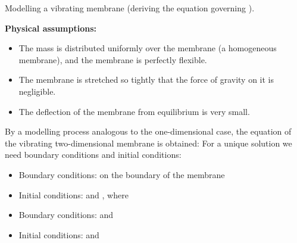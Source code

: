 
Modelling a vibrating membrane (deriving the equation governing ).

\textbf{Physical assumptions:}

\begin{itemize}
\tightlist
\item
  The mass is distributed uniformly over the membrane (a homogeneous membrane), and the membrane is perfectly flexible.
\item
  The membrane is stretched so tightly that the force of gravity on it is negligible.
\item
  The deflection of the membrane from equilibrium is very small.
\end{itemize}


By a modelling process analogous to the one-dimensional case, the equation of the vibrating two-dimensional membrane is obtained:
For a unique solution we need boundary conditions and initial conditions:

\begin{itemize}
\tightlist
\item
  Boundary conditions:  on the boundary of the membrane
\item
  Initial conditions:  and , where 
\end{itemize}





\begin{itemize}
\tightlist
\item
  Boundary conditions:  and 
\item
  Initial conditions:  and 
\end{itemize}

